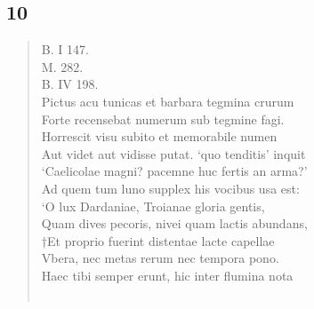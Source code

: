 \documentclass[11pt, a4paper]{report}
\begin{document}
            \subsection*{10}
      \begin{verse}
      B. I 147. \\ M. 282. \\ B. IV 198. \\ Pictus acu tunicas et barbara tegmina crurum \\ Forte recensebat numerum sub tegmine fagi. \\ Horrescit visu subito et memorabile numen \\ Aut videt aut vidisse putat. ‘quo tenditis’ inquit \\ ‘Caelicolae magni? pacemne huc fertis an arma?’ \\ Ad quem tum luno supplex his vocibus usa est: \\ ‘O lux Dardaniae, Troianae gloria gentis, \\ Quam dives pecoris, nivei quam lactis abundans, \\ †Et proprio fuerint distentae lacte capellae \\ Vbera, nec metas rerum nec tempora pono. \\ Haec tibi semper erunt, hic inter flumina nota \\ 
        ﻿\pagebreak 

\end{verse}
\end{document}
